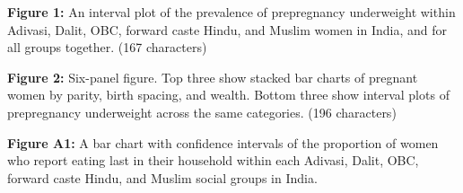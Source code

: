 \documentclass[12pt]{article}
\begin{document}
\textbf{Figure 1:}  An interval plot of the prevalence of prepregnancy underweight within Adivasi, Dalit, OBC, forward caste Hindu, and Muslim women in India, and for all groups together. (167 characters)

\textbf{Figure 2:} Six-panel figure. Top three show stacked bar charts of pregnant women by parity, birth spacing, and wealth. Bottom three show interval plots of prepregnancy underweight across the same categories. (196 characters)

\textbf{Figure A1:} A bar chart with confidence intervals of the proportion of women who report eating last in their household within each Adivasi, Dalit, OBC, forward caste Hindu, and Muslim social groups in India.


 
\end{document}
